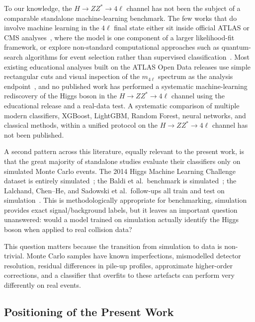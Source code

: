 \documentclass[conference]{IEEEtran}
\begin{document}
{To our knowledge, the $H \rightarrow ZZ^{*} \rightarrow 4\ell$ channel has not been the subject of a comparable standalone machine-learning benchmark. The few works that do involve machine learning in the $4\ell$ final state either sit inside official ATLAS or CMS analyses~\cite{atlas2018higgsmass,atlas2023run2mass}, where the model is one component of a larger likelihood-fit framework, or explore non-standard computational approaches such as quantum-search algorithms for event selection rather than supervised classification~\cite{kim2021quantum}. Most existing educational analyses built on the ATLAS Open Data releases use simple rectangular cuts and visual inspection of the $m_{4\ell}$ spectrum as the analysis endpoint~\cite{evans2021atlasopendata}, and no published work has performed a systematic machine-learning rediscovery of the Higgs boson in the $H \rightarrow ZZ^{*} \rightarrow 4\ell$ channel using the educational release and a real-data test. A systematic comparison of multiple modern classifiers, XGBoost, LightGBM, Random Forest, neural networks, and classical methods, within a unified protocol on the $H \rightarrow ZZ^{*} \rightarrow 4\ell$ channel has not been published.
 
A second pattern across this literature, equally relevant to the present work, is that the great majority of standalone studies evaluate their classifiers only on simulated Monte Carlo events. The 2014 Higgs Machine Learning Challenge dataset is entirely simulated~\cite{adambourdarios2015higgsml}; the Baldi et al.\ benchmark is simulated~\cite{baldi2014deeplearning}; the Lalchand, Chen--He, and Sadowski et al.\ follow-ups all train and test on simulation~\cite{chen2015higgsxgb,lalchand2020bdt}. This is methodologically appropriate for benchmarking, simulation provides exact signal/background labels, but it leaves an important question unanswered: would a model trained on simulation actually identify the Higgs boson when applied to real collision data?
 
This question matters because the transition from simulation to data is non-trivial. Monte Carlo samples have known imperfections, mismodelled detector resolution, residual differences in pile-up profiles, approximate higher-order corrections, and a classifier that overfits to these artefacts can perform very differently on real events.
 
\subsection{Positioning of the Present Work}
 
}
\end{document}
